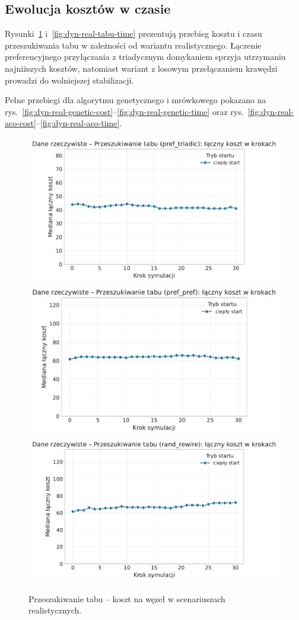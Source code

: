 \subsection{Ewolucja kosztów w czasie}

Rysunki~\ref{fig:dyn-real-tabu-cost} i~\ref{fig:dyn-real-tabu-time} prezentują przebieg kosztu i czasu przeszukiwania tabu w zależności od wariantu realistycznego. Łączenie preferencyjnego przyłączania z triadycznym domykaniem sprzyja utrzymaniu najniższych kosztów, natomiast wariant z losowym przełączaniem krawędzi prowadzi do wolniejszej stabilizacji.

Pełne przebiegi dla algorytmu genetycznego i mrówkowego pokazano na rys.~\ref{fig:dyn-real-genetic-cost}--\ref{fig:dyn-real-genetic-time} oraz rys.~\ref{fig:dyn-real-aco-cost}--\ref{fig:dyn-real-aco-time}.

\begin{figure}[H]
  \centering
  \includegraphics[width=0.62\linewidth]{assets/figures/dynamic/real/real_przeszukiwanie_tabu_cost_over_steps_pref_triadic.pdf}\\[0.4em]
  \includegraphics[width=0.62\linewidth]{assets/figures/dynamic/real/real_przeszukiwanie_tabu_cost_over_steps_pref_pref.pdf}\\[0.4em]
  \includegraphics[width=0.62\linewidth]{assets/figures/dynamic/real/real_przeszukiwanie_tabu_cost_over_steps_rand_rewire.pdf}
  \caption{Przeszukiwanie tabu -- koszt na węzeł w scenariuszach realistycznych.}
  \label{fig:dyn-real-tabu-cost}
\end{figure}

